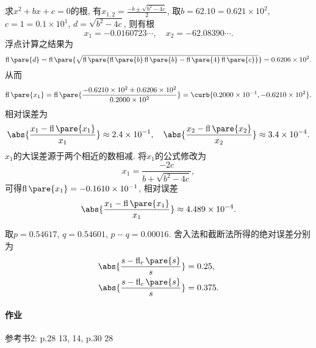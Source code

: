\documentclass[hidelinks]{ctexart}
\DeclareMathOperator{\fl}{fl}
\begin{document}
\begin{ex}
    求$x^2+bx+c = 0$的根, 有$\displaystyle x_{1,2} = \frac{-b\pm \sqrt{b^2 - 4c}}{2}$, 取$b=62.10 = 0.621\times 10^2$, $c = 1 = 0.1\times 10^1$, $d=\sqrt{b^2 - 4c}$, 则有根
    \[ x_1 = -0.0160723\cdots,\quad x_2 = -62.08390\cdots. \]
    浮点计算之结果为
    \[ \fl\pare{d} = \fl\pare{\sqrt{\fl\pare{\fl\pare{b}\fl\pare{b} - \fl\pare{4}\fl\pare{c}}}} = 0.6206\times 10^2. \]
    从而
    \[ \fl\pare{x_1} = \fl\pare{\frac{-0.6210\times 10^2 \pm 0.6206\times 10^2}{0.2000\times 10^2}} = \curb{0.2000\times 10^{-1}, -0.6210\times 10^2}. \]
    相对误差为
    \[ \abs{\frac{x_1 - \fl\pare{x_1}}{x_1}} \approx 2.4\times 10^{-1},\quad \abs{\frac{x_2 - \fl\pare{x_2}}{x_2}} \approx 3.4\times 10^{-4}. \]
    $x_1$的大误差源于两个相近的数相减. 将$x_1$的公式修改为
    \[ x_1 = \frac{-2c}{b + \sqrt{b^2 - 4c}}, \]
    可得$\fl\pare{x_1} = -0.1610\times 10^{-1}$, 相对误差
    \[ \abs{\frac{x_1 - \fl\pare{x_1}}{x_1}} \approx 4.489\times 10^{-4}. \]
\end{ex}
\begin{ex}
    取$p = 0.54617$, $q = 0.54601$, $p-q = 0.00016$. 舍入法和截断法所得的绝对误差分别为
    \begin{align*}
        \abs{\frac{s - \fl_r\pare{s}}{s}} &= 0.25, \\
        \abs{\frac{s - \fl_c\pare{s}}{s}} &= 0.375.
    \end{align*}
\end{ex}

\paragraph{作业} %
\label{par:作业}

参考书2: p.28 13, 14, p.30 28



\end{document}
